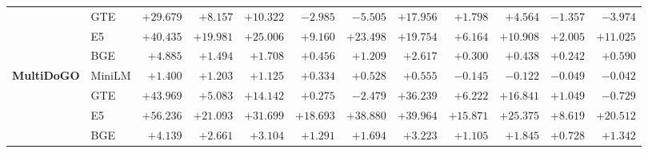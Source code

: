 \begin{table}[!t]
\begin{tabular}{@{}llrrrrrrrrrr@{}}
 & GTE & $+29.679$ & $+8.157$ & $+10.322$ & $\boldsymbol{-2.985}$ & $\boldsymbol{-5.505}$ & $+17.956$ & $+1.798$ & $+4.564$ & $\boldsymbol{-1.357}$ & $\boldsymbol{-3.974}$ \\
 & E5 & $+40.435$ & $+19.981$ & $+25.006$ & $+9.160$ & $+23.498$ & $+19.754$ & $+6.164$ & $+10.908$ & $+2.005$ & $+11.025$ \\
 & BGE & $+4.885$ & $+1.494$ & $+1.708$ & $+0.456$ & $+1.209$ & $+2.617$ & $+0.300$ & $+0.438$ & $+0.242$ & $+0.590$ \\
\midrule
\textbf{MultiDoGO} & MiniLM & $+1.400$ & $+1.203$ & $+1.125$ & $+0.334$ & $+0.528$ & $+0.555$ & $\boldsymbol{-0.145}$ & $\boldsymbol{-0.122}$ & $\boldsymbol{-0.049}$ & $\boldsymbol{-0.042}$ \\
 & GTE & $+43.969$ & $+5.083$ & $+14.142$ & $+0.275$ & $\boldsymbol{-2.479}$ & $+36.239$ & $+6.222$ & $+16.841$ & $+1.049$ & $\boldsymbol{-0.729}$ \\
 & E5 & $+56.236$ & $+21.093$ & $+31.699$ & $+18.693$ & $+38.880$ & $+39.964$ & $+15.871$ & $+25.375$ & $+8.619$ & $+20.512$ \\
 & BGE & $+4.139$ & $+2.661$ & $+3.104$ & $+1.291$ & $+1.694$ & $+3.223$ & $+1.105$ & $+1.845$ & $+0.728$ & $+1.342$ \\
\bottomrule
\end{tabular}
\end{table}

